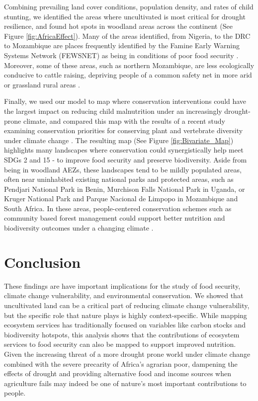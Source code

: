 \documentclass{article}
\begin{document}
Combining prevailing land cover conditions, population density, and rates of child stunting, we identified the areas where uncultivated is most critical for drought resilience, and found hot spots in woodland areas across the continent (See Figure \ref{fig:AfricaEffect}).  Many of the areas identified, from Nigeria, to the DRC to Mozambique are places frequently identified by the Famine Early Warning Systems Network (FEWSNET) as being in conditions of poor food security \cite{FEWSNET2017, FEWSNET2018, FEWSNET2020}.  Moreover, some of these areas, such as northern Mozambique, are less ecologically conducive to cattle raising, depriving people of a common safety net in more arid or grassland rural areas \cite{mabiso2014food}.

Finally, we used our model to map where conservation interventions could have the largest impact on reducing child malnutrition under an increasingly drought-prone climate, and compared this map with the results of a recent study examining conservation priorities for conserving plant and vertebrate diversity under climate change \cite{hannah2020}.  The resulting map (See Figure \ref{fig:Bivariate_Map}) highlights many landscapes where conservation could synergistically help meet SDGs 2 and 15 - to improve food security and preserve biodiversity.  Aside from being in woodland AEZs, these landscapes tend to be mildly populated areas, often near uninhabited existing national parks and protected areas, such as Pendjari National Park in Benin, Murchison Falls National Park in Uganda, or Kruger National Park and Parque Nacional de Limpopo in Mozambique and South Africa.  In these areas, people-centered conservation schemes such as community based forest management could support better nutrition and biodiversity outcomes under a changing climate \cite{bray2003mexico}.

\section{Conclusion}
These findings are have important implications for the study of food security, climate change vulnerability, and environmental conservation.  We showed that uncultivated land can be a critical part of reducing climate change vulnerability, but the specific role that nature plays is highly context-specific.  While mapping ecosystem services has traditionally focused on variables like carbon stocks and biodiversity hotspots, this analysis shows that the contributions of ecosystem services to food security can also be mapped to support improved nutrition.  Given the increasing threat of a more drought prone world under climate change \cite{Dai2013} combined with the severe precarity of Africa's agrarian poor, dampening the effects of drought and providing alternative food and income sources when agriculture fails may indeed be one of nature's most important contributions to people.
\end{document}
